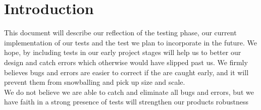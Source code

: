 \section{Introduction}
This document will describe our reflection of the testing phase, our current implementation of our tests and the test we plan to incorporate in the future. We hope, by including tests in our early project stages will help us to better our design and catch errors which otherwise would have slipped past us. We firmly believes bugs and errors are easier to correct if the are caught early, and it will prevent them from snowballing and pick up size and scale.\\
We do not believe we are able to catch and eliminate all bugs and errors, but we have faith in a strong presence of tests will strengthen our products robustness 
